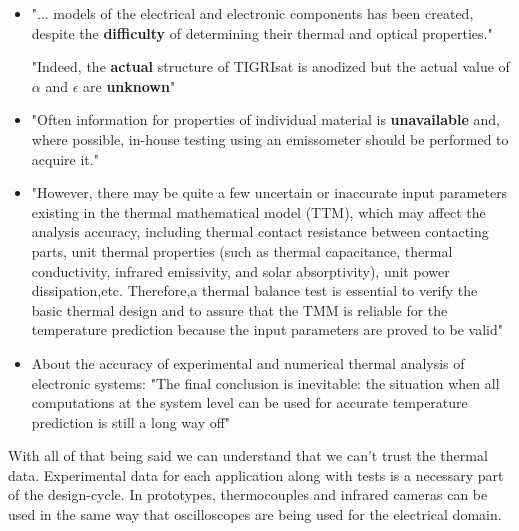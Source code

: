 \documentclass[final]{cubedoc}
\begin{document}
	\begin{itemize}
		\item "... models of the electrical and electronic components has been created, despite the \textbf{difficulty} of determining their thermal and optical properties." 
		
		"Indeed, the \textbf{actual} structure of TIGRIsat is anodized but the actual value of $\alpha$  and $\epsilon$ are \textbf{unknown}" \cite{paris2015}
		\item "Often information for properties of individual material is \textbf{unavailable} and, where possible, in-house testing using an emissometer should be performed to acquire it." \cite{mccarron2018developing}
		
		
		\item "However, there may be quite a few uncertain or inaccurate input parameters existing in the thermal mathematical model (TTM), which may affect the analysis accuracy, including thermal contact resistance between contacting parts, unit thermal properties (such as thermal capacitance, thermal conductivity, infrared emissivity, and solar absorptivity), unit power dissipation,etc. Therefore,a thermal balance test is essential to verify the basic thermal design and to assure that the TMM is reliable for the temperature prediction because the input parameters are proved to be valid" \cite{tsai2004overview}
		
		
		
		\item About the accuracy of experimental and numerical thermal analysis of electronic systems: "The final conclusion is inevitable: the situation when all computations at the system level can be used for accurate temperature prediction is still a long way off" \cite{lasance2002}
	\end{itemize}
	
	With all of that being said we can understand that we can't trust the thermal data. Experimental data for each application along with tests is a necessary part of the design-cycle. In prototypes, thermocouples and infrared cameras can be used in the same way that oscilloscopes are being used for the electrical domain.
	
\end{document}
